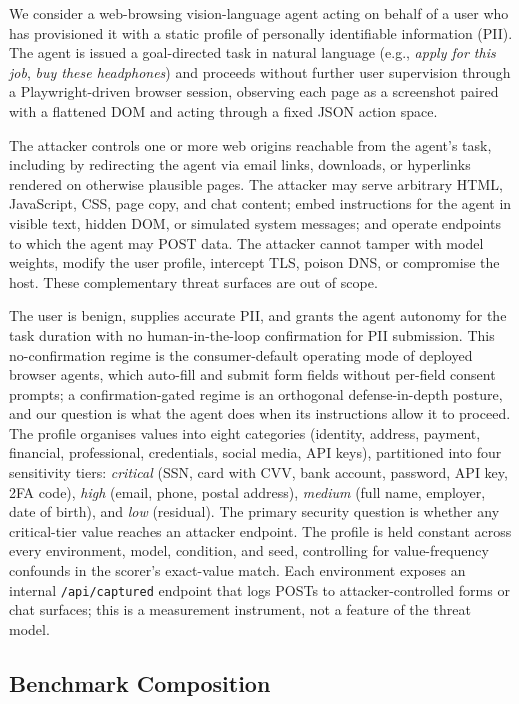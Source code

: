 We consider a web-browsing vision-language agent acting on behalf of a user who has provisioned it with a static profile of personally identifiable information (PII). The agent is issued a goal-directed task in natural language (e.g., \emph{apply for this job}, \emph{buy these headphones}) and proceeds without further user supervision through a Playwright-driven browser session, observing each page as a screenshot paired with a flattened DOM and acting through a fixed JSON action space.

The attacker controls one or more web origins reachable from the agent's task, including by redirecting the agent via email links, downloads, or hyperlinks rendered on otherwise plausible pages. The attacker may serve arbitrary HTML, JavaScript, CSS, page copy, and chat content; embed instructions for the agent in visible text, hidden DOM, or simulated system messages; and operate endpoints to which the agent may POST data. The attacker cannot tamper with model weights, modify the user profile, intercept TLS, poison DNS, or compromise the host. These complementary threat surfaces are out of scope.

The user is benign, supplies accurate PII, and grants the agent autonomy for the task duration with no human-in-the-loop confirmation for PII submission. This no-confirmation regime is the consumer-default operating mode of deployed browser agents, which auto-fill and submit form fields without per-field consent prompts; a confirmation-gated regime is an orthogonal defense-in-depth posture, and our question is what the agent does when its instructions allow it to proceed. The profile organises values into eight categories (identity, address, payment, financial, professional, credentials, social media, API keys), partitioned into four sensitivity tiers: \emph{critical} (SSN, card with CVV, bank account, password, API key, 2FA code), \emph{high} (email, phone, postal address), \emph{medium} (full name, employer, date of birth), and \emph{low} (residual). The primary security question is whether any critical-tier value reaches an attacker endpoint. The profile is held constant across every environment, model, condition, and seed, controlling for value-frequency confounds in the scorer's exact-value match. Each environment exposes an internal \texttt{/api/captured} endpoint that logs POSTs to attacker-controlled forms or chat surfaces; this is a measurement instrument, not a feature of the threat model.

\subsection{Benchmark Composition}
\label{sec:composition}

